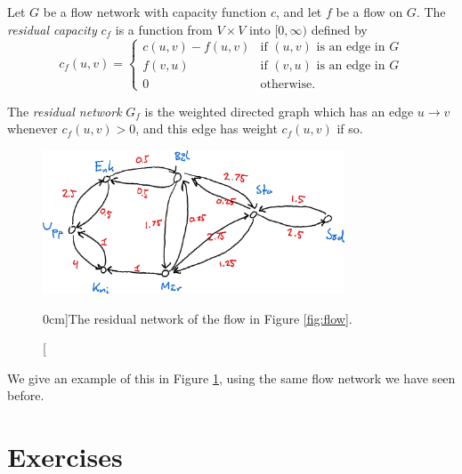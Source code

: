 \documentclass[nobib]{tufte-handout}
\begin{document}
\begin{definition}
    Let $G$ be a flow network with capacity function $c$, and let $f$ be a flow on $G$. The \emph{residual capacity} $c_f$ is a function from $V\times V$ into $[0,\infty)$ defined by
    $$c_f(u,v) = \begin{cases}
        c(u,v) - f(u,v)&\text{if }(u,v)\text{ is an edge in }G\\
        f(v,u)&\text{if }(v,u)\text{ is an edge in }G\\
        0&\text{otherwise.}
    \end{cases}$$
    
    The \emph{residual network} $G_f$ is the weighted directed graph which has an edge $u \to v$ whenever $c_f(u,v) > 0$, and this edge has weight $c_f(u,v)$ if so.

    \begin{figure}
        \centering
        \includegraphics[width=0.8\textwidth]{graphics/L7_flows/residual_network.png}
        \caption[][0cm]{The residual network of the flow in Figure \ref{fig:flow}.}
        \label{fig:residual_network}
    \end{figure}

    We give an example of this in Figure \ref{fig:residual_network}, using the same flow network we have seen before.
\end{definition}

\section{Exercises}

%
%
\end{document}
